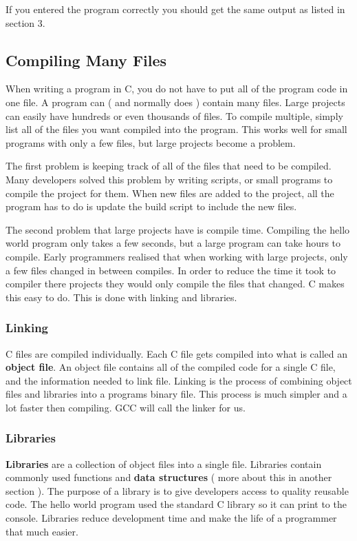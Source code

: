 \documentclass[10pt,a4paper]{paper}
\begin{document}
If you entered the program correctly you should get the same output as listed in section 3.  

\subsection*{Compiling Many Files}
When writing a program in C, you do not have to put all of the program code in one file.  A program can ( and normally does ) contain many files.  Large projects can easily have hundreds or even thousands of files.  To compile multiple, simply list all of the files you want compiled into the program.  This works well for small programs with only a few files, but large projects become a problem.  

The first problem is keeping track of all of the files that need to be compiled.  Many developers solved this problem by writing scripts, or small programs to compile the project for them.  When new files are added to the project, all the program has to do is update the build script to include the new files.

The second problem that large projects have is compile time.  Compiling the hello world program only takes a few seconds, but a large program can take hours to compile.  Early programmers realised that when working with large projects, only a few files changed in between compiles.  In order to reduce the time it took to compiler there projects they would only compile the files that changed.  C makes this easy to do.  This is done with linking and libraries.

\subsubsection*{Linking}
C files are compiled individually.  Each C file gets compiled into what is called an \textbf{object file}.  An object file contains all of the compiled code for a single C file, and the information needed to link file.  Linking is the process of combining object files and libraries into a programs binary file.  This process is much simpler and a lot faster then compiling.  GCC will call the linker for us.

\subsubsection*{Libraries}
\textbf{Libraries} are a collection of object files into a single file.  Libraries contain commonly used functions and \textbf{data structures} ( more about this in another section ).  The purpose of a library is to give developers access to quality reusable code.  The hello world program used the standard C library so it can print to the console.  Libraries reduce development time and make the life of a programmer that much easier.  
\end{document}
